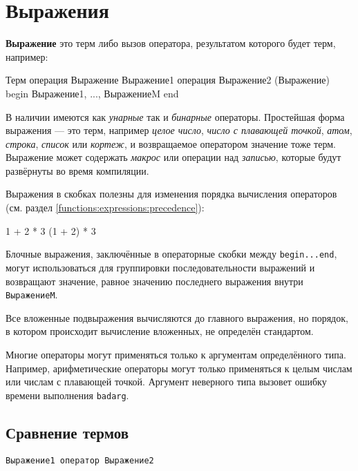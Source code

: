 \section{Выражения}
\label{functions:expressions}

\textbf{Выражение} это терм либо вызов оператора, результатом которого будет терм, 
например:

\begin{erlangru}
Терм
операция Выражение
Выражение1 операция Выражение2
(Выражение)
begin
   Выражение1,
   ...,
   ВыражениеM            %
end
\end{erlangru}

В наличии имеются как \emph{унарные} так и \emph{бинарные} операторы. Простейшая
форма выражения --- это терм, например \emph{целое число}, \emph{число с плавающей
точкой}, \emph{атом}, \emph{строка}, \emph{список} или \emph{кортеж}, и 
возвращаемое оператором значение тоже терм. Выражение может содержать \emph{макрос}
или операции над \emph{записью}, которые будут развёрнуты во время компиляции.

Выражения в скобках полезны для изменения порядка вычисления операторов (см.  
раздел \ref{functions:expressions:precedence}):

\begin{erlang}
1 + 2 * 3           %
(1 + 2) * 3         %
\end{erlang}

Блочные выражения, заключённые в операторные скобки между \texttt{begin...end},
могут использоваться для группировки последовательности выражений и возвращают 
значение, равное значению последнего выражения внутри \texttt{ВыражениеM}.

Все вложенные подвыражения вычисляются до главного выражения, но порядок, в котором
происходит вычисление вложенных, не определён стандартом.

Многие операторы могут применяться только к аргументам определённого типа. 
Например, арифметические операторы могут только применяться к целым числам или 
числам с плавающей точкой. Аргумент неверного типа вызовет ошибку времени 
выполнения \texttt{badarg}.


\subsection{Сравнение термов}
\begin{verbatim}
Выражение1 оператор Выражение2
\end{verbatim}

